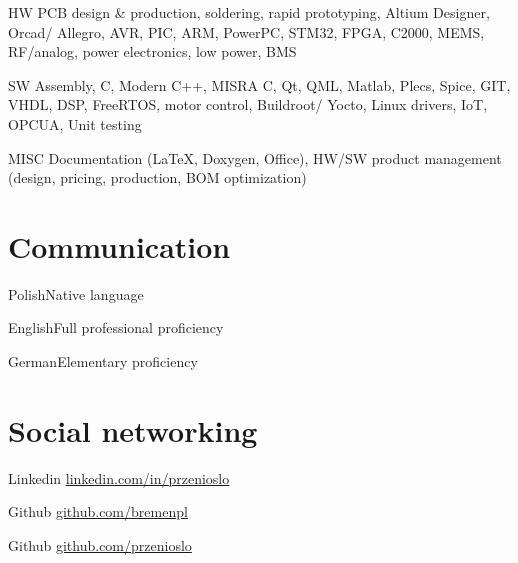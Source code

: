 \documentclass{tccv}
\begin{document}
\begin{factlist}

\item{HW}
     {PCB design \& production, soldering, rapid prototyping, Altium Designer, Orcad/ Allegro, AVR, PIC, ARM, PowerPC, STM32, FPGA, C2000, MEMS, RF/analog, power electronics, low power, BMS}

\item{SW}
     {Assembly, C, Modern C++, MISRA C, Qt, QML, Matlab, Plecs, Spice, GIT, VHDL, DSP, FreeRTOS, motor control, Buildroot/ Yocto, Linux drivers, IoT, OPCUA, Unit testing}
     
\item{MISC}
     {Documentation (\LaTeX, Doxygen, Office), HW/SW product management (design, pricing, production, BOM optimization)}

\end{factlist}

\section{Communication}

\begin{factlist}
\item{Polish}{Native language}
\item{English}{Full professional proficiency}
\item{German}{Elementary proficiency}
\end{factlist}

\section{Social networking}

\begin{factlist}

\item{Linkedin}
     {\href{http://pl.linkedin.com/in/przenioslo}{linkedin.com/in/przenioslo}}
     
\item{Github}
     {\href{http://github.com/bremenpl}{github.com/bremenpl}}
     
\item{Github}
     {\href{http://github.com/przenioslo}{github.com/przenioslo}}

\end{factlist} 

\vspace*{\fill} %
\end{document}
